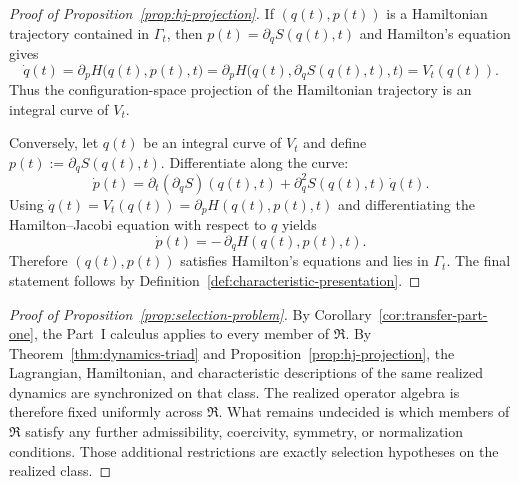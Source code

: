 \begin{proof}[Proof of Proposition~\ref{prop:hj-projection}]
\label{proof:prop:hj-projection}
If $(q(t),p(t))$ is a Hamiltonian trajectory contained in $\Gamma_t$, then
$p(t)=\partial_q S(q(t),t)$ and Hamilton's equation gives
\[
\dot q(t) = \partial_p H\bigl(q(t),p(t),t\bigr)
          = \partial_p H\bigl(q(t),\partial_q S(q(t),t),t\bigr)
          = V_t(q(t)).
\]
Thus the configuration-space projection of the Hamiltonian trajectory is an
integral curve of $V_t$.

Conversely, let $q(t)$ be an integral curve of $V_t$ and define
$p(t):=\partial_q S(q(t),t)$. Differentiate along the curve:
\[
\dot p(t)=\partial_t(\partial_q S)(q(t),t)+\partial_q^2S(q(t),t)\,\dot q(t).
\]
Using $\dot q(t)=V_t(q(t))=\partial_p H(q(t),p(t),t)$ and differentiating the
Hamilton--Jacobi equation with respect to $q$ yields
\[
\dot p(t) = -\,\partial_q H(q(t),p(t),t).
\]
Therefore $(q(t),p(t))$ satisfies Hamilton's equations and lies in $\Gamma_t$.
The final statement follows by Definition~\ref{def:characteristic-presentation}.
\end{proof}

\begin{proof}[Proof of Proposition~\ref{prop:selection-problem}]
\label{proof:prop:selection-problem}
By Corollary~\ref{cor:transfer-part-one}, the Part~I calculus applies to every
member of $\mathfrak R$. By Theorem~\ref{thm:dynamics-triad} and
Proposition~\ref{prop:hj-projection}, the Lagrangian, Hamiltonian, and
characteristic descriptions of the same realized dynamics are synchronized on
that class. The realized operator algebra is therefore fixed uniformly across
$\mathfrak R$. What remains undecided is which members of $\mathfrak R$ satisfy
any further admissibility, coercivity, symmetry, or normalization conditions.
Those additional restrictions are exactly selection hypotheses on the realized
class.
\end{proof}

